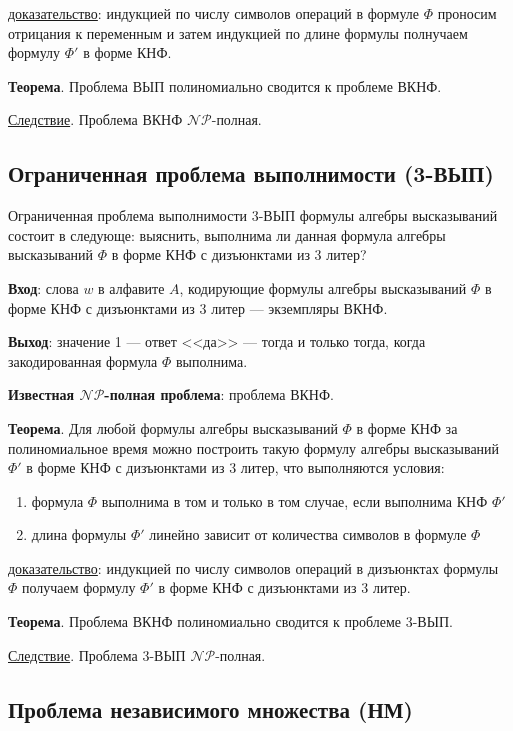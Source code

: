 \underline{доказательство}: индукцией по числу символов операций в формуле $\Phi$ проносим отрицания к переменным и затем индукцией по длине формулы полнучаем формулу $\Phi'$ в форме КНФ.

\textbf{Теорема}. Проблема ВЫП полиномиально сводится к проблеме ВКНФ.

\underline{Следствие}. Проблема ВКНФ $\mathscr{NP}$-полная.

\subsection{Ограниченная проблема выполнимости (3-ВЫП)}
Ограниченная проблема выполнимости 3-ВЫП формулы алгебры высказываний состоит в следующе: выяснить, выполнима ли данная формула алгебры высказываний $\Phi$ в форме КНФ с дизъюнктами из 3 литер?

\textbf{Вход}: слова $w$ в алфавите $A$, кодирующие формулы алгебры высказываний $\Phi$ в форме КНФ с дизъюнктами из 3 литер --- экземпляры ВКНФ.

\textbf{Выход}: значение 1 --- ответ <<да>> --- тогда и только тогда, когда закодированная формула $\Phi$ выполнима.

\textbf{Известная $\mathscr{NP}$-полная проблема}: проблема ВКНФ.

\textbf{Теорема}. Для любой формулы алгебры высказываний $\Phi$ в форме КНФ за полиномиальное время можно построить такую формулу алгебры высказываний $\Phi'$ в форме КНФ с дизъюнктами из 3 литер, что выполняются условия:

\begin{enumerate}
    \item формула $\Phi$ выполнима в том и только в том случае, если выполнима КНФ $\Phi'$
    \item длина формулы $\Phi'$ линейно зависит от количества символов в формуле $\Phi$
\end{enumerate}

\underline{доказательство}: индукцией по числу символов операций в дизъюнктах формулы $\Phi$ получаем формулу $\Phi'$ в форме КНФ с дизъюнктами из 3 литер.

\textbf{Теорема}. Проблема ВКНФ полиномиально сводится к проблеме 3-ВЫП.

\underline{Следствие}. Проблема 3-ВЫП $\mathscr{NP}$-полная.

\subsection{Проблема независимого множества (НМ)}

